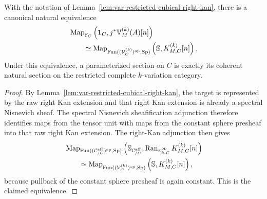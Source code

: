 \begin{corollary}
\label{cor:var-restricted-global-sections-right-kan}
With the notation of Lemma~\ref{lem:var-restricted-cubical-right-kan}, there is a canonical natural equivalence
\[
\begin{aligned}
    &
    \operatorname{Map}_{\mathcal E_C}
    \left(
      \mathbf 1_C,
      j^*\mathbb V_M^{(k)}(A)[n]
    \right)
    \\
    &\qquad\simeq
    \operatorname{Map}_{
      \operatorname{Fun}(
        (\mathcal V_C^{(k)})^{\mathrm{op}},
        \operatorname{Sp}
      )
    }
    \left(
      \mathbb S,
      K_{M,C}^{(k)}[n]
    \right).
\end{aligned}
\]
Under this equivalence, a parameterized section on \(C\) is exactly its coherent natural section on the restricted complete \(k\)-variation category.
\end{corollary}

\begin{proof}
By Lemma~\ref{lem:var-restricted-cubical-right-kan}, the target is represented by the raw right Kan extension and that right Kan extension is already a spectral Nisnevich sheaf.  The spectral Nisnevich sheafification adjunction therefore identifies maps from the tensor unit with maps from the constant sphere presheaf into that raw right Kan extension.  The right-Kan adjunction then gives
\[
\begin{aligned}
    &
    \operatorname{Map}_{\operatorname{Fun}(
      (\mathcal C^{\mathrm{aff}}_{/C})^{\mathrm{op}},
      \operatorname{Sp})}
    \left(
      \mathbb S_{\mathcal C^{\mathrm{aff}}_{/C}},
      \operatorname{Ran}_{\pi_{k,C}^{\mathrm{op}}}
      K_{M,C}^{(k)}[n]
    \right)
    \\
    &\qquad\simeq
    \operatorname{Map}_{
      \operatorname{Fun}(
        (\mathcal V_C^{(k)})^{\mathrm{op}},
        \operatorname{Sp}
      )
    }
    \left(
      \mathbb S,
      K_{M,C}^{(k)}[n]
    \right),
\end{aligned}
\]
because pullback of the constant sphere presheaf is again constant.  This is the claimed equivalence.
\end{proof}

